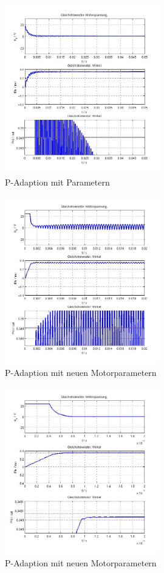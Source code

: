 \begin{figure}[ht]
	\centering
	\includegraphics[width=0.6\textwidth]{Pad-P50F1_3F2_400.jpg}
	\caption{P-Adaption mit Parametern}
	\label{padp50f3400}
\end{figure}


\begin{figure}[ht]
	\centering
	\includegraphics[width=0.6\textwidth]{Pad-Werte-P330F1_5F2_370.jpg}
	\caption{P-Adaption mit neuen Motorparametern}
	\label{padwerte}
\end{figure}


\begin{figure}[ht]
	\centering
	\includegraphics[width=0.6\textwidth]{Pad-Neue-Werte-P320F1_2F2_160.jpg}
	\caption{P-Adaption mit neuen Motorparametern}
	\label{padneuewerte}
\end{figure}
